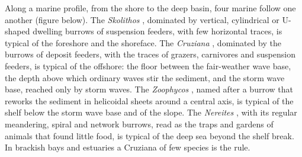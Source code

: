 Along a marine profile, from the shore to the deep basin, four marine  follow one
another (figure below). The \emph{Skolithos} , dominated by vertical, cylindrical or
U-shaped dwelling burrows of suspension feeders, with few horizontal traces, is typical of the
foreshore and the shoreface. The \emph{Cruziana} , dominated by the burrows of
deposit feeders, with the traces of grazers, carnivores and suspension feeders, is typical of the
offshore: the floor between the fair-weather wave base, the depth above which ordinary waves stir
the sediment, and the storm wave base, reached only by storm waves. The \emph{Zoophycos}
, named after a burrow that reworks the sediment in helicoidal sheets around a central
axis, is typical of the shelf below the storm wave base and of the slope. The \emph{Nereites}
, with its regular meandering, spiral and network burrows, read as the traps and
gardens of animals that found little food, is typical of the deep sea beyond the shelf break. In
brackish bays and estuaries a Cruziana  of few species is the rule.

